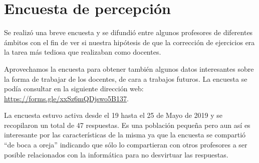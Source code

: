 \section{Encuesta de percepción}

Se realizó una breve encuesta y se difundió entre algunos profesores de diferentes ámbitos con el fin de ver si nuestra hipótesis de que la corrección de ejercicios era la tarea más tediosa que realizaban como docentes.

\bigskip
Aprovechamos la encuesta para obtener también algunos datos interesantes sobre la forma de trabajar de los docentes, de cara a trabajos futuros. La encuesta se podía consultar en la siguiente dirección web: \url{https://forms.gle/xxSz6mQDjswo5B137}.

\bigskip
La encuesta estuvo activa desde el 19 hasta el 25 de Mayo de 2019 y se recopilaron un total de 47 respuestas. Es una población pequeña pero aun así es interesante por las características de la misma ya que la encuesta se compartió ``de boca a oreja'' indicando que sólo lo compartieran con otros profesores a ser posible relacionados con la informática para no desvirtuar las respuestas.


